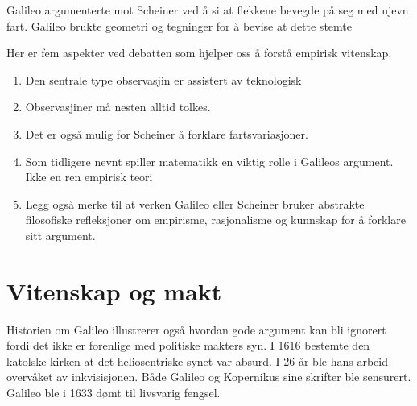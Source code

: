 \documentclass[11pt]{article}
\begin{document}
Galileo argumenterte mot Scheiner ved å si at flekkene bevegde på seg med ujevn fart. Galileo brukte geometri og tegninger for å bevise at dette stemte

Her er fem aspekter ved debatten som hjelper oss å forstå empirisk vitenskap.

\begin{enumerate}
    \item Den sentrale type observasjin er assistert av teknologisk
    \item Observasjiner må nesten alltid tolkes.
    \item Det er også mulig for Scheiner å forklare fartsvariasjoner.
    \item Som tidligere nevnt spiller matematikk en viktig rolle i Galileos argument. Ikke en ren empirisk teori
    \item Legg også merke til at verken Galileo eller Scheiner bruker abstrakte filosofiske refleksjoner om empirisme, rasjonalisme og kunnskap for å forklare sitt argument.
\end{enumerate}


\section{Vitenskap og makt}

Historien om Galileo illustrerer også hvordan gode argument kan bli ignorert fordi det ikke er forenlige med politiske makters syn. I 1616 bestemte den katolske kirken at det heliosentriske synet var absurd. I 26 år ble hans arbeid overvåket av inkvisisjonen.
Både Galileo og Kopernikus sine skrifter ble sensurert. Galileo ble i 1633 dømt til livsvarig fengsel.
\end{document}

